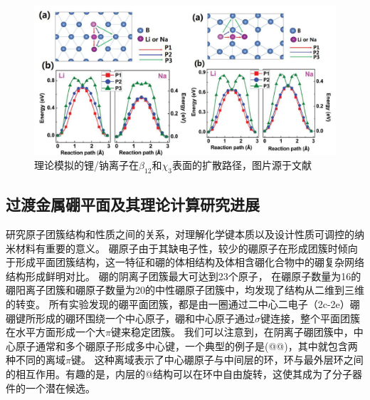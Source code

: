 \begin{figure}[bt]
  \includegraphics[width=1.0\textwidth]{figs/ch1_lina_borophene.png}
  \centering
  \caption{理论模拟的锂/钠离子在$\beta_{12}$和$\chi_3$表面的扩散路径，图片源于文献\cite{zhang2016borophene}}
  \label{fig:ch1_lina_borophene}
\end{figure}

\subsection{过渡金属硼平面及其理论计算研究进展}
研究原子团簇结构和性质之间的关系，对理解化学键本质以及设计性质可调控的纳米材料有重要的意义。
硼原子由于其缺电子性，较少的硼原子在形成团簇时倾向于形成平面团簇结构\cite{xu2017practical}，这一特征和硼的体相结构及体相含硼化合物中的硼复杂网络结构形成鲜明对比。
硼的阴离子团簇最大可达到23个原子\cite{alexandrova2004molecular, alexandrova2004electronic, kiran2005planar, alexandrova2006all, sergeeva2008photoelectron, huang2010concentric, sergeeva2011all, piazza2012photoelectron, sergeeva2012b22, zhai2003hydrocarbon, zhai2003hepta}，
在硼原子数量为16的硼阳离子团簇和硼原子数量为20的中性硼原子团簇中，均发现了结构从二维到三维的转变\cite{kiran2005planar, tai2012structure, oger2007boron}。
所有实验发现的硼平面团簇\cite{romanescu2013transition}，都是由一圈通过二中心二电子（2c-2e）硼硼键所形成的硼环围绕一个中心原子，硼和中心原子通过$\sigma$键连接，整个平面团簇在水平方面形成一个大$\pi$键来稳定团簇。
我们可以注意到，在阴离子硼团簇中，中心原子通常和多个硼原子形成多中心键，一个典型的例子是(@@)\cite{huang2010concentric}，其中就包含两种不同的离域$\pi$键。
这种离域表示了中心硼原子与中间层的环，环与最外层环之间的相互作用。有趣的是，内层的@结构可以在环中自由旋转，这使其成为了分子器件的一个潜在候选。


